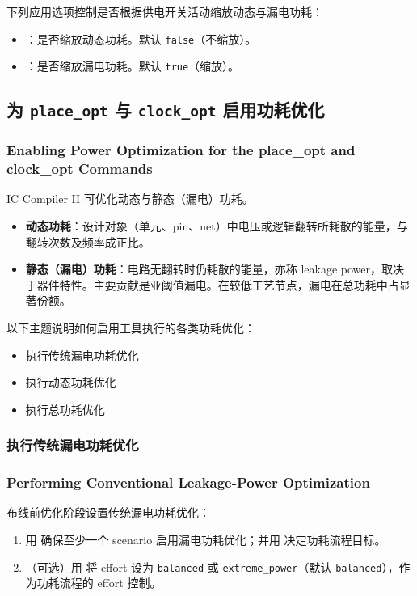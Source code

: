 下列应用选项控制是否根据供电开关活动缩放动态与漏电功耗：
\begin{itemize}
  \item {}：是否缩放动态功耗。默认 \texttt{false}（不缩放）。
  \item {}：是否缩放漏电功耗。默认 \texttt{true}（缩放）。
\end{itemize}

\subsection{为 \texttt{place\_opt} 与 \texttt{clock\_opt} 启用功耗优化}
\subsubsection*{Enabling Power Optimization for the place\_opt and clock\_opt Commands}

IC Compiler II 可优化动态与静态（漏电）功耗。
\begin{itemize}
  \item \textbf{动态功耗}：设计对象（单元、pin、net）中电压或逻辑翻转所耗散的能量，与翻转次数及频率成正比。
  \item \textbf{静态（漏电）功耗}：电路无翻转时仍耗散的能量，亦称 leakage power，取决于器件特性。主要贡献是亚阈值漏电。在较低工艺节点，漏电在总功耗中占显著份额。
\end{itemize}

以下主题说明如何启用工具执行的各类功耗优化：
\begin{itemize}
  \item 执行传统漏电功耗优化
  \item 执行动态功耗优化
  \item 执行总功耗优化
\end{itemize}

\subsubsection{执行传统漏电功耗优化}
\subsubsection*{Performing Conventional Leakage-Power Optimization}

布线前优化阶段设置传统漏电功耗优化：
\begin{enumerate}
  \item 用  确保至少一个 scenario 启用漏电功耗优化；并用  决定功耗流程目标。
  \item （可选）用  将 effort 设为 \texttt{balanced} 或 \texttt{extreme\_power}（默认 \texttt{balanced}），作为功耗流程的 effort 控制。
\end{enumerate}

